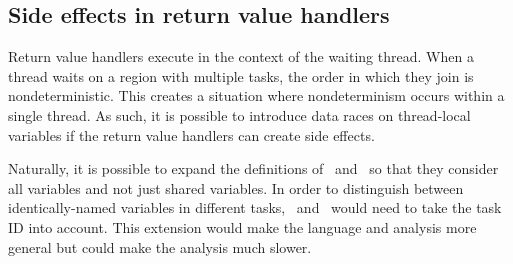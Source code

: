 \subsection{Side effects in return value handlers}
\label{sec:side-effects-rvhs}

Return value handlers execute in the context of the waiting thread.
When a thread waits on a region with multiple tasks, the order in
which they join is nondeterministic. This creates a situation where
nondeterminism occurs within a single thread. As such, it is possible
to introduce data races on thread-local variables if the return value
handlers can create side effects.

Naturally, it is possible to expand the definitions of \rv\ and \wv\
so that they consider all variables and not just shared variables. In
order to distinguish between identically-named variables in different
tasks, \rv\ and \wv\ would need to take the task ID into account. This
extension would make the language and analysis more general but could
make the analysis much slower.
